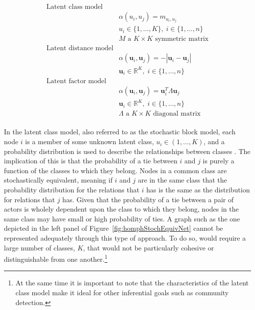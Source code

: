 \documentclass[12pt,pdflatex]{elsarticle}
\begin{document}
\begin{align}
\begin{aligned}
\text{Latent class model} \\
	&\alpha(u_{i}, u_{j}) = m_{u_{i}, u_{j}} \\
	&u_{i} \in \{1, \ldots, K \}, \; i \in \{1,\ldots, n\} \\
	&M \text{ a } K \times K \text{ symmetric matrix} \\
\text{Latent distance model} \\
	&\alpha(\textbf{u}_{i}, \textbf{u}_{j}) = -|\textbf{u}_{i} - \textbf{u}_{j}| \\
	&\textbf{u}_{i} \in \mathbb{R}^{K}, \; i \in \{1, \ldots, n \} \\
\text{Latent factor model} \\
	&\alpha(\textbf{u}_{i}, \textbf{u}_{j}) = \textbf{u}_{i}^{T} \Lambda \textbf{u}_{j} \\
	&\textbf{u}_{i} \in \mathbb{R}^{K}, \; i \in \{1, \ldots, n \} \\
	&\Lambda \text{ a } K \times K \text{ diagonal matrix}
\label{eqn:latAlpha}
\end{aligned}
\end{align}

In the latent class model, also referred to as the stochastic block model, each node $i$ is a member of some unknown latent class, $u_{i} \in (1,\ldots,K)$, and a probability distribution is used to describe the relationships between classes  \citep{nowicki:snijders:2001}. The implication of this is that the probability of a tie between $i$ and $j$ is purely a function of the classes to which they belong. Nodes in a common class are stochastically equivalent, meaning if $i$ and $j$ are in the same class that the probability distribution for the relations that $i$ has is the same as the distribution for relations that $j$ has. Given that the probability of a tie between a pair of actors is wholely dependent upon the class to which they belong, nodes in the same class may have small or high probability of ties. A graph such as the one depicted in the left panel of Figure~\ref{fig:homphStochEquivNet} cannot be represented adequately through this type of approach. To do so, would require a large number of classes, $K$, that would not be particularly cohesive or distinguishable from one another.\footnote{At the same time it is important to note that the characteristics of the latent class model make it ideal for other inferential goals such as community detection.}
\end{document}
